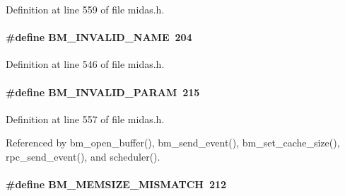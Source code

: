 \begin{DoxyItemize}
\item 
\end{DoxyItemize}

Definition at line 559 of file midas.h.
\paragraph[{BM\_\-INVALID\_\-NAME}]{\setlength{\rightskip}{0pt plus 5cm}\#define BM\_\-INVALID\_\-NAME~204}\hfill\label{group__err22_ga3320beea9944241434c6bf98d2392414}

\begin{DoxyItemize}
\item 
\end{DoxyItemize}

Definition at line 546 of file midas.h.
\paragraph[{BM\_\-INVALID\_\-PARAM}]{\setlength{\rightskip}{0pt plus 5cm}\#define BM\_\-INVALID\_\-PARAM~215}\hfill\label{group__err22_ga09095b8ac6e057d3094c99e485c1a74d}

\begin{DoxyItemize}
\item 
\end{DoxyItemize}

Definition at line 557 of file midas.h.

Referenced by bm\_\-open\_\-buffer(), bm\_\-send\_\-event(), bm\_\-set\_\-cache\_\-size(), rpc\_\-send\_\-event(), and scheduler().
\paragraph[{BM\_\-MEMSIZE\_\-MISMATCH}]{\setlength{\rightskip}{0pt plus 5cm}\#define BM\_\-MEMSIZE\_\-MISMATCH~212}\hfill\label{group__err22_ga2d978469667eb3d51ea7cc48a5070a72}

\begin{DoxyItemize}
\item 
\end{DoxyItemize}

